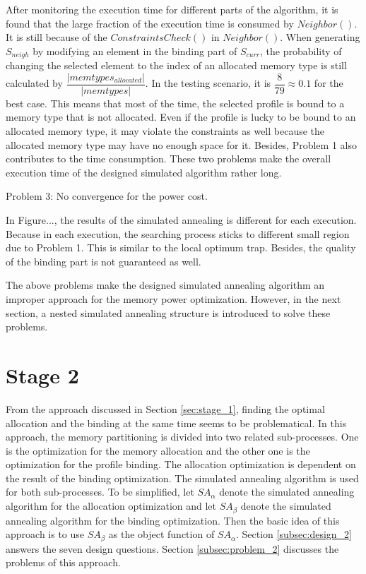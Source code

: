 		After monitoring the execution time for different parts of the algorithm,
		it is found that the large fraction of the execution time is consumed
		by $Neighbor()$. It is still because of the $ConstraintsCheck()$ in $Neighbor()$.
		When generating $S_{neigh}$ by modifying an element in the binding part of
		$S_{curr}$, the probability of changing the selected element to the
		index of an allocated memory type is still calculated by
		$\dfrac{\lvert memtypes_{allocated} \rvert}{\lvert memtypes \rvert}$.
		In the testing scenario, it is $\dfrac{8}{79} \approx 0.1$ for the best case.
		This means that most of the time, the selected profile is bound to a memory
		type that is not allocated. Even if the profile is lucky to be bound to an
		allocated memory type, it may violate the constraints as well because the
		allocated memory type may have no enough space for it.
		Besides, Problem 1 also contributes to the time consumption.
		These two problems make the overall execution time of the designed simulated
		algorithm rather long.
		
		Problem 3: No convergence for the power cost.
		
		In Figure..., the results of the simulated annealing is different for each
		execution. Because in each execution, the searching process sticks to different
		small region due to Problem 1. This is similar to the local optimum trap.
		Besides, the quality of the binding part is not guaranteed as well.
		
		The above problems make the designed simulated annealing algorithm an
		improper approach for the memory power optimization. However, in the next
		section, a nested simulated annealing structure is introduced to solve
		these problems.
		
	\section{Stage 2}
	\label{sec:stage_2}
	From the approach discussed in Section \ref{sec:stage_1}, finding the optimal
	allocation and the binding at the same time seems to be problematical.
	In this approach, the memory partitioning is divided into two related sub-processes.
	One is the optimization for the memory allocation and the other one is the
	optimization for the profile binding.
	The allocation optimization is dependent on the result of the binding optimization.
	The simulated annealing algorithm is used for both sub-processes.
	To be simplified, let $SA_{\alpha}$ denote the simulated annealing algorithm for the
	allocation optimization and let $SA_{\beta}$ denote the simulated annealing algorithm
	for the binding optimization. Then the basic idea of this approach is to use $SA_{\beta}$
	as the object function of $SA_{\alpha}$.
	Section \ref{subsec:design_2} answers the seven design questions.
	Section \ref{subsec:problem_2} discusses the problems of this approach.
	
